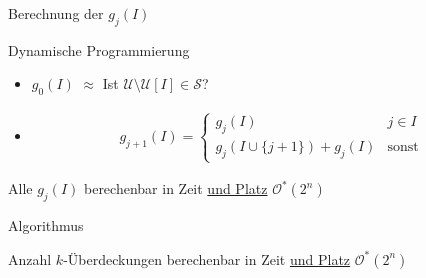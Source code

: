\documentclass[table,german,10pt]{beamer}
\begin{document}
\begin{frame}{Berechnung der $g_{j}(I)$}
  \begin{block}{Dynamische Programmierung}
    \begin{itemize}[<+->]
    \item $g_{0}(I)$ $\approx$ Ist $\mathcal{U}\setminus
      \mathcal{U}[I]\in \mathcal{S}$?
    \item 
      \begin{align*}
        g_{j+1}(I)=
        \begin{cases}
          g_{j}(I) & j\in I\\
          g_{j}(I\cup \{j+1\})+g_{j}(I) & \text{sonst}
        \end{cases}
      \end{align*}
    \end{itemize}
  \end{block}
  \pause
  Alle $g_{j}(I)$ berechenbar in Zeit \underline{und Platz} $\mathcal{O}^{*}(2^{n})$
\end{frame}  
\begin{frame}{Algorithmus}
  \begin{theorem}
    Anzahl $k$-Überdeckungen berechenbar in Zeit \underline{und Platz}
    $\mathcal{O}^{*}(2^{n})$ 
  \end{theorem}
  
\end{frame}
\end{document}
